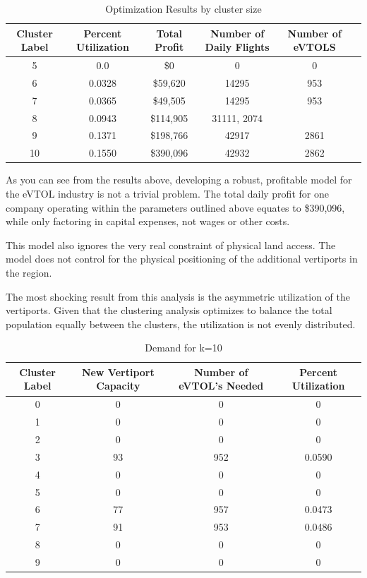 \documentclass{article}
\begin{document}
\begin{table}[h!]
\centering
\caption{Optimization Results by cluster size}
\begin{tabular}{|c c c c c c|} 
 \hline
Cluster Label& Percent Utilization & Total Profit & Number of Daily Flights & Number of eVTOLS \\ [0.5ex] 
 \hline\hline
	5	& 0.0 & \$0	&  0 & 0 \\
	6&	0.0328&	\$59,620&		14295 & 953\\
	7&	0.0365&	\$49,505&		14295 & 953\\
	8&	0.0943&	\$114,905&		31111, 2074\\
	9&	0.1371&	\$198,766&		42917 & 2861\\
	10&	0.1550&	\$390,096&		42932 & 2862\\ [1ex] 
 \hline
\end{tabular}
\label{table:proj02}
\end{table}


As you can see from the results above, developing a robust, profitable model for the eVTOL industry is not a trivial problem. The total daily profit for one company operating within the parameters outlined above equates to \$390,096, while only factoring in capital expenses, not wages or other costs. 

This model also ignores the very real constraint of physical land access. The model does not control for the physical positioning of the additional vertiports in the region.

The most shocking result from this analysis is the asymmetric utilization of the vertiports. Given that the clustering analysis optimizes to balance the total population equally between the clusters, the utilization is not evenly distributed.

\begin{table}[h!]
\centering
\caption{Demand for k=10}
\begin{tabular}{|c c c c|} 
 \hline
Cluster Label& New Vertiport Capacity& Number of eVTOL's Needed& Percent Utilization  \\ [0.5ex] 
 \hline\hline
0&0 & 0 & 0\\ 
1&0 & 0 & 0\\
2&0 & 0 & 0\\
3&93 & 952 & 0.0590\\
4&0 & 0 & 0\\
5&0 & 0 & 0\\
6&77 & 957 & 0.0473\\
7&91 & 953 & 0.0486\\
8&0 & 0 & 0\\
9&0 & 0 & 0\\[1ex] 
 \hline
\end{tabular}
\label{table:proj02}
\end{table}
\end{document}
